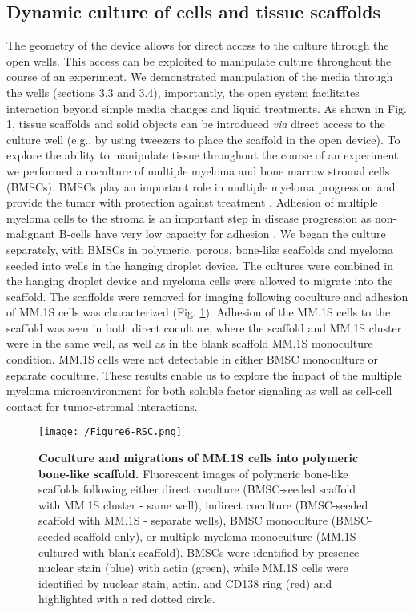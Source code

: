 \subsection{Dynamic culture of cells and tissue scaffolds}
The geometry of the device allows for direct access to the culture through the open wells. This access can be exploited to manipulate culture throughout the course of an experiment. We demonstrated manipulation of the media through the wells (sections 3.3 and 3.4), importantly, the open system facilitates interaction beyond simple media changes and liquid treatments. As shown in Fig. 1, tissue scaffolds and solid objects can be introduced \textit{via} direct access to the culture well (e.g., by using tweezers to place the scaffold in the open device). To explore the ability to manipulate tissue throughout the course of an experiment, we performed a coculture of multiple myeloma and bone marrow stromal cells (BMSCs). BMSCs play an important role in multiple myeloma progression and provide the tumor with protection against treatment \cite{Chauhan1996, Chatterjee2002a}. Adhesion of multiple myeloma cells to the stroma is an important step in disease progression as non-malignant B-cells have very low capacity for adhesion \cite{Tai2006}.
We began the culture separately, with BMSCs in polymeric, porous, bone-like scaffolds and myeloma seeded into wells in the hanging droplet device. The cultures were combined in the hanging droplet device and myeloma cells were allowed to migrate into the scaffold. The scaffolds were removed for imaging following coculture and adhesion of MM.1S cells was characterized (Fig. \ref{figure:Fig6}). Adhesion of the MM.1S cells to the scaffold was seen in both direct coculture, where the scaffold and MM.1S cluster were in the same well, as well as in the blank scaffold MM.1S monoculture condition. MM.1S cells were not detectable in either BMSC monoculture or separate coculture. These results enable us to explore the impact of the multiple myeloma microenvironment for both soluble factor signaling as well as cell-cell contact for tumor-stromal interactions. 

\begin{figure}[ht] %
\centering
\texttt{[image: /Figure6-RSC.png]}
\caption{\textbf{Coculture and migrations of MM.1S cells into polymeric bone-like scaffold.} Fluorescent images of polymeric bone-like scaffolds following either direct coculture (BMSC-seeded scaffold with MM.1S cluster - same well), indirect coculture (BMSC-seeded scaffold with MM.1S - separate wells), BMSC monoculture (BMSC-seeded scaffold only), or multiple myeloma monoculture (MM.1S cultured with blank scaffold). BMSCs were identified by presence nuclear stain (blue) with actin (green), while MM.1S cells were identified by nuclear stain, actin, and CD138 ring (red) and highlighted with a red dotted circle.}
\label{figure:Fig6}
\end{figure}


